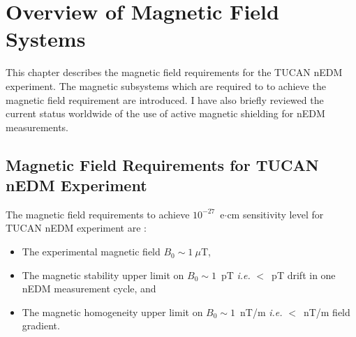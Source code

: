 \chapter{Overview of Magnetic Field Systems}\label{ch:magnetics}



This chapter describes the magnetic field requirements for the TUCAN nEDM experiment. The magnetic subsystems which are required to to achieve the magnetic field requirement are introduced. I have also briefly reviewed the current status worldwide of the use of active magnetic shielding for nEDM measurements.


\section{Magnetic Field Requirements for TUCAN nEDM Experiment}\label{sec:msr}

The magnetic field requirements to achieve $10^{-27}$~e$\cdot$cm sensitivity level for TUCAN nEDM experiment are :

\begin{itemize}

    \item The experimental magnetic field $B_0\sim1~\mu$T, 
    \item The magnetic stability upper limit on $B_0\sim1$~pT {\it i.e.} $<$~pT drift in one nEDM measurement cycle, and 
    \item The magnetic homogeneity upper limit on $B_0\sim1$~nT/m {\it i.e.} $<$~nT/m field gradient. 
    
\end{itemize}





